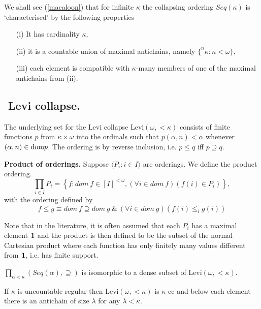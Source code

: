 We shall see (\ref{macaloon}) that for infinite $\kappa$ the collapsing ordering $Seq(\kappa)$ is `characterised' by the following properties
\begin{itemize}
\item[(i)]  It has cardinality $\kappa$,
\item[(ii)]  it is a countable union of maximal antichains, namely $\{ ^n\kappa:n<\omega\}$,
\item[(iii)]  each element is compatible with $\kappa$-many members of one of the maximal antichains from (ii).
\end{itemize}

\subsection{${}$ \hspace{-1em}Levi collapse.}


The underlying set for the Levi collapse Levi$(\omega,<\!\!\!\kappa)$ consists of finite functions $p$ from $\kappa\times\omega$ into the ordinals
such that $p(\alpha,n)<\alpha$ whenever $(\alpha,n)\in\hbox{dom} p$. The ordering is by reverse inclusion, i.e. $p\leq q$ iff $p\supseteq q$.

\begin{definition}\label{product}
{\bf Product of orderings.} Suppose $\langle P_i:i\in I\rangle$ are orderings. We define the product ordering.
$$ %
\prod_{i\in I}P_i=\left\{f: dom\ f\in[I]^{<\omega}, (\forall i\in dom\ f)(f(i)\in P_i)\right\},
$$ %
with the ordering defined by
$$ %
f\leq g\equiv dom\ f\supseteq dom\ g\ \&\ (\forall i\in dom\ g)(f(i)\leq_i g(i))
$$ %
\end{definition}

Note that in the literature, it is often assumed that each $P_i$ has a maximal element $\hbox{\bf 1}$ and the product is then defined to be the
subset of the normal Cartesian product where each function has only finitely many values different from $\hbox{\bf 1}$, i.e. has finite support.

\begin{fact}%
 $\prod_{\alpha<\kappa} (Seq(\alpha),\supseteq)$ is isomorphic to a dense subset of Levi$(\omega,<\!\!\kappa)$.
\end{fact}%

\begin{proposition}\label{levi-isom}
If $\kappa$ is uncountable regular then Levi$(\omega,<\!\!\!\kappa)$
is $\kappa$-cc and below each element there is an antichain of size
$\lambda$ for any $\lambda<\kappa$.
\end{proposition}

